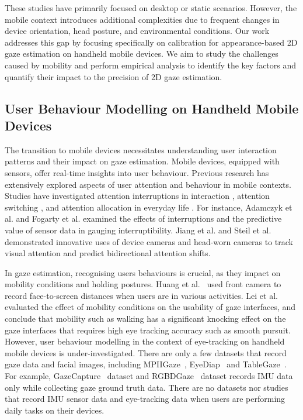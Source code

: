 These studies have primarily focused on desktop or static scenarios. However, the mobile context introduces additional complexities due to frequent changes in device orientation, head posture, and environmental conditions. Our work addresses this gap by focusing specifically on calibration for appearance-based 2D gaze estimation on handheld mobile devices. We aim to study the challenges caused by mobility and perform empirical analysis to identify the key factors and quantify their impact to the precision of 2D gaze estimation. 


\subsection{User Behaviour Modelling on Handheld Mobile Devices}
The transition to mobile devices necessitates understanding user interaction patterns and their impact on gaze estimation. Mobile devices, equipped with sensors, offer real-time insights into user behaviour.
Previous research has extensively explored aspects of user attention and behaviour in mobile contexts. Studies have investigated attention interruptions in interaction \cite{adamczyk2004if, fogarty2005predicting}, attention switching \cite{steil2018forecasting}, and attention allocation in everyday life \cite{bace2020quantification}. For instance, Adamczyk et al. \cite{adamczyk2004if} and Fogarty et al. \cite{fogarty2005predicting} examined the effects of interruptions and the predictive value of sensor data in gauging interruptibility. Jiang et al. \cite{jiang2016vads} and Steil et al. \cite{steil2018forecasting} demonstrated innovative uses of device cameras and head-worn cameras to track visual attention and predict bidirectional attention shifts.

In gaze estimation, recognising users behaviours is crucial, as they impact on mobility conditions and holding postures. Huang et al.~\cite{huang2017screenglint} used front camera to record face-to-screen distances when users are in various activities. Lei et al.~\cite{lei2023DynamicRead} evaluated the effect of mobility conditions on the usability of gaze interfaces, and conclude that mobility such as walking has a significant knocking effect on the gaze interfaces that requires high eye tracking accuracy such as smooth pursuit. 
However, user behaviour modelling in the context of eye-tracking on handheld mobile devices is under-investigated. There are only a few datasets that record gaze data and facial images, including MPIIGaze~\cite{zhang2017mpiigaze}, EyeDiap~\cite{funes2014eyediap} and TableGaze~\cite{huang2017tabletgaze}.  For example, GazeCapture~\cite{krafka2016eye} dataset and RGBDGaze~\cite{arakawa2022rgbdgaze} dataset records IMU data only while collecting gaze ground truth data. There are no datasets nor studies that record IMU sensor data and eye-tracking data when users are performing daily tasks on their devices. 

